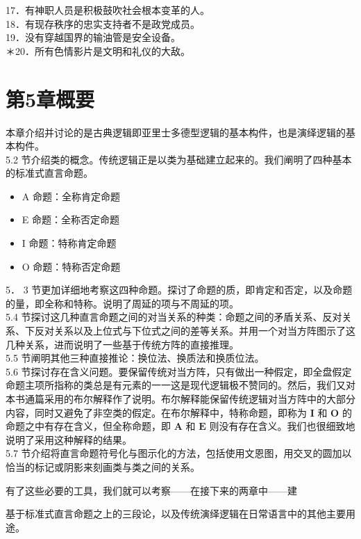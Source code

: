 17．有神职人员是积极鼓吹社会根本变革的人。\\
18．有现存秩序的忠实支持者不是政党成员。\\
19．没有穿越国界的输油管是安全设备。\\
＊20．所有色情影片是文明和礼仪的大敌。

\section*{第5章概要}
本章介绍并讨论的是古典逻辑即亚里士多德型逻辑的基本构件，也是演绎逻辑的基本构件。\\
5.2 节介绍类的概念。传统逻辑正是以类为基础建立起来的。我们阐明了四种基本的标准式直言命题。

\begin{itemize}
  \item A 命题：全称肯定命题
  \item E 命题：全称否定命题
  \item I 命题：特称肯定命题
  \item O 命题：特称否定命题
\end{itemize}

5． 3 节更加详细地考察这四种命题。探讨了命题的质，即肯定和否定，以及命题的量，即全称和特称。说明了周延的项与不周延的项。\\
5.4 节探讨这几种直言命题之间的对当关系的种类：命题之间的矛盾关系、反对关系、下反对关系以及上位式与下位式之间的差等关系。并用一个对当方阵图示了这几种关系，进而说明了一些基于传统方阵的直接推理。\\
5.5 节阐明其他三种直接推论：换位法、换质法和换质位法。\\
5.6 节探讨存在含义问题。要保留传统对当方阵，只有做出一种假定，即全盘假定命题主项所指称的类总是有元素的一一这是现代逻辑极不赞同的。然后，我们又对本书通篇采用的布尔解释作了说明。布尔解释能保留传统逻辑对当方阵中的大部分内容，同时又避免了非空类的假定。在布尔解释中，特称命题，即称为 $\mathbf{I}$ 和 $\mathbf{O}$ 的命题之中有存在含义，但全称命题，即 $\mathbf{A}$ 和 $\mathbf{E}$ 则没有存在含义。我们也很细致地说明了采用这种解释的结果。\\
5.7 节介绍将直言命题符号化与图示化的方法，包括使用文恩图，用交叉的圆加以恰当的标记或阴影来刻画类与类之间的关系。

有了这些必要的工具，我们就可以考察——在接下来的两章中——建

基于标准式直言命题之上的三段论，以及传统演绎逻辑在日常语言中的其他主要用途。

